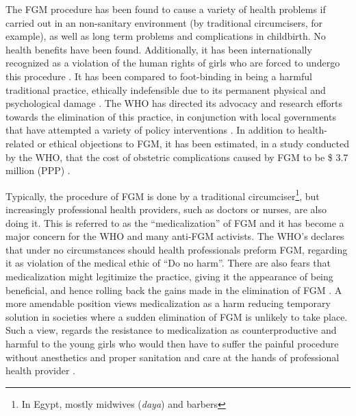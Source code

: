 \documentclass[12pt]{article}
\begin{document}
The FGM procedure has been found to cause a variety of health problems if carried out in an non-sanitary environment (by traditional circumcisers, for example), as well as long term problems and complications in childbirth.  No health benefits have been found. Additionally, it has been internationally recognized as a violation of the human rights of girls who are forced to undergo this procedure \citep{whofs241}. It has been compared to foot-binding in being a harmful traditional practice, ethically indefensible due to its permanent physical and psychological damage \citep{Mackie1996}. The WHO has directed its advocacy and research efforts towards the elimination of this practice, in conjunction with local governments that have attempted a variety of policy interventions \citep{whofs241}. In addition to health-related or ethical objections to FGM, it has been estimated, in a study conducted by the WHO, that the cost of obstetric complications caused by FGM to be \$ 3.7 million (PPP) \citep{Bishai2010}.

Typically, the procedure of FGM  is done by a traditional circumciser\footnote{In Egypt, mostly midwives (\emph{daya}) and barbers}, but increasingly professional health providers, such as doctors or nurses, are also doing it.  This is referred to as the ``medicalization'' of FGM and it has become a major concern for the WHO and many anti-FGM activists. The WHO's declares that under no circumstances should health professionals preform FGM, regarding it as violation of the medical ethic of ``Do no harm''. There are also fears that medicalization might legitimize the practice, giving it the appearance of being beneficial, and hence rolling back the gains made in the elimination of FGM \citep{OHCHR}. A more amendable position views medicalization as a harm reducing temporary solution in societies where a sudden elimination of FGM is unlikely to take place.  Such a view, regards the resistance to medicalization as counterproductive and harmful to the young girls who would then have to suffer the painful procedure without anesthetics and proper sanitation and care at the hands of professional health provider \citep{Shell-Duncan2001}. 
\end{document}
